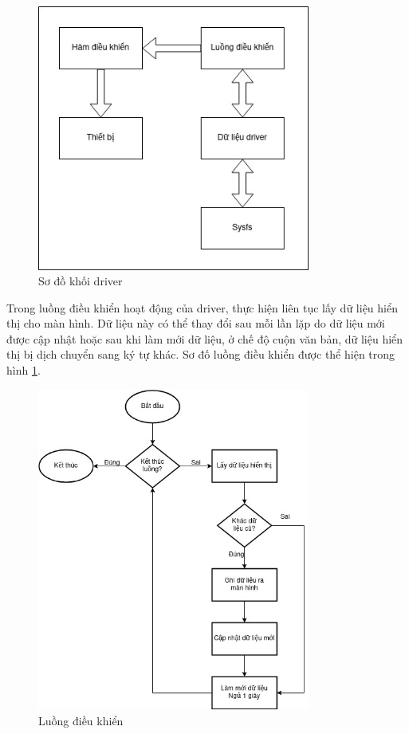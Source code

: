 \documentclass{report}
\begin{document}
\begin{figure}[H]
	\centering
	\includegraphics[width=0.8\textwidth]{images/driver.jpg}
	\caption{Sơ đồ khối driver}
\end{figure}
Trong luồng điều khiển hoạt động của driver, thực hiện liên tục lấy dữ liệu hiển thị cho màn hình. Dữ liệu này có thể thay đổi sau mỗi lần lặp do dữ liệu mới được cập nhật hoặc sau khi làm mới dữ liệu, ở chế độ cuộn văn bản, dữ liệu hiển thị bị dịch chuyển sang ký tự khác. Sơ đố luồng điều khiển được thể hiện trong hình \ref{f:work-thread}.
\begin{figure}[H]
	\centering
	\includegraphics[width=0.8\textwidth]{images/driver-work-thread.jpg}
	\caption{Luồng điều khiển}
	\label{f:work-thread}
\end{figure}
\end{document}
